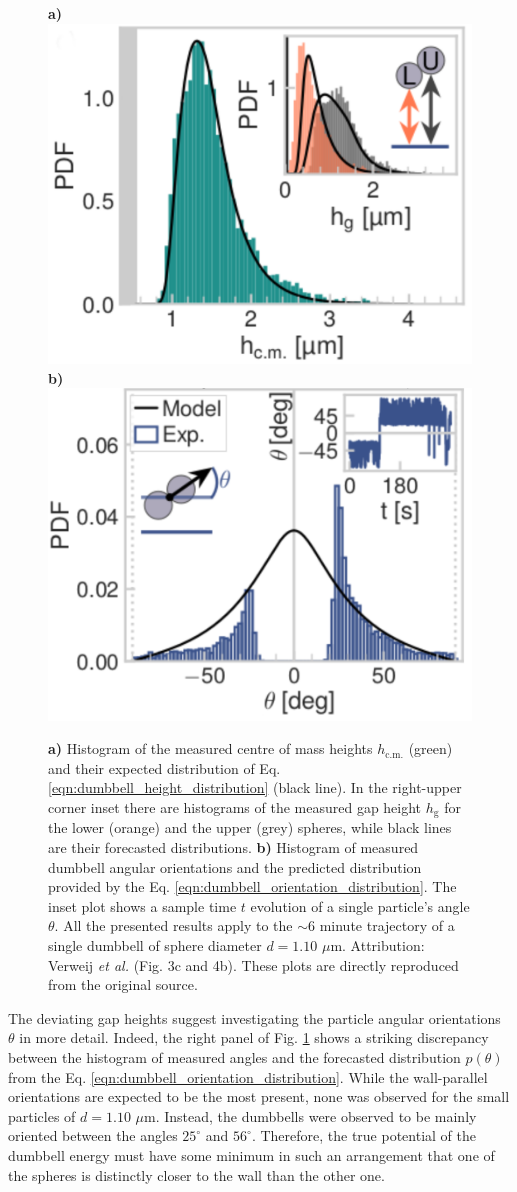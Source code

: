\documentclass{master_thesis}
\begin{document}
\begin{figure}
    \begin{minipage}{\linewidth}
         \centering
         \textbf{a)}
         \includegraphics[width=0.45\linewidth,valign=t]{figures/small_dumbbell_heights.png}
         \textbf{b)}
         \includegraphics[width=0.45\linewidth,valign=t]{figures/small_dumbbell_orientations.png}
    \end{minipage}
    \caption{
    \textbf{a)} Histogram of the measured centre of mass heights $h_{\textrm{c.m.}}$ (green) and their expected distribution of Eq. \eqref{eqn:dumbbell_height_distribution} (black line). In the right-upper corner inset there are histograms of the measured gap height $h_{\textrm{g}}$ for the lower (orange) and the upper (grey) spheres, while black lines are their forecasted distributions. 
    \textbf{b)} Histogram of measured dumbbell angular orientations and the predicted distribution provided by the Eq. \eqref{eqn:dumbbell_orientation_distribution}. The inset plot shows a sample time $t$ evolution of a single particle's angle $\theta$. All the presented results apply to the $\sim 6$ minute trajectory of a single dumbbell of sphere diameter $d=1.10$ $\mu$m. Attribution: Verweij \textit{et al.} \cite{verweij2021} (Fig. 3c and 4b). These plots are directly reproduced from the original source.
    }
\label{fig:dumbbell_experimental_distributions}
\end{figure}

The deviating gap heights suggest investigating the particle angular orientations $\theta$ in more detail. Indeed, the right panel of Fig. \ref{fig:dumbbell_experimental_distributions} shows a striking discrepancy between the histogram of measured angles and the forecasted distribution $p(\theta)$ from the Eq. \eqref{eqn:dumbbell_orientation_distribution}. While the wall-parallel orientations are expected to be the most present, none was observed for the small particles of $d=1.10$ $\mu$m. Instead, the dumbbells were observed to be mainly oriented between the angles $25^{\circ}$ and $56^{\circ}$. Therefore, the true potential of the dumbbell energy must have some minimum in such an arrangement that one of the spheres is distinctly closer to the wall than the other one.
\end{document}
